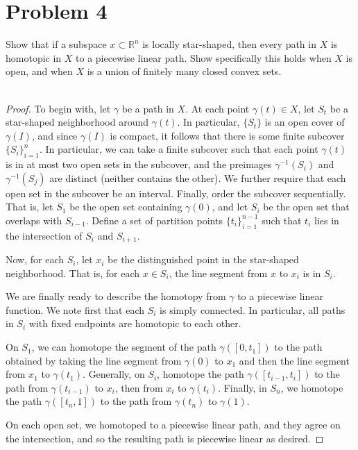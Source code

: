 \documentclass[fontsize=11pt]{scrartcl} %
\numberwithin{equation}{section} %
\numberwithin{figure}{section} %
\numberwithin{table}{section} %
\newcommand{\R}{\mathbb{R}}
\begin{document}
\section*{Problem 4}
Show that if a subspace $x\subset \R^n$ is locally star-shaped, then every path
in $X$ is homotopic in $X$ to a piecewise linear path. Show specifically this
holds when $X$ is open, and when $X$ is a union of finitely many closed convex
sets.
\\
\\
\begin{proof}
    To begin with, let $\gamma$ be a path in $X$. At each point $\gamma(t)\in
    X$, let $S_t$ be a star-shaped neighborhood around $\gamma(t)$. In
    particular, $\{S_t\}$ is an open cover of $\gamma(I)$, and since $\gamma(I)$
    is compact, it follows that there is some finite subcover $\{S_i\}_{i=1}^n$.
    In particular, we can take a finite subcover such that each point
    $\gamma(t)$ is in at most two open sets in the subcover, and the preimages
    $\gamma^{-1}(S_i)$ and $\gamma^{-1}(S_j)$ are distinct (neither contains the
    other). We further require that each open set in the subcover be an
    interval. Finally, order the subcover sequentially. That is, let $S_1$ be the
    open set containing $\gamma(0)$, and let $S_i$ be the open set that overlaps
    with $S_{i-1}$. Define a set of partition points $\{t_i\}_{i=1}^{n-1}$ such
    that $t_i$ lies in the intersection of $S_i$ and $S_{i+1}$.

    Now, for each $S_i$, let $x_i$ be the distinguished point in the star-shaped
    neighborhood. That is, for each $x\in S_i$, the line segment from $x$ to
    $x_i$ is in $S_i$.

    We are finally ready to describe the homotopy from $\gamma$ to a piecewise
    linear function. We note first that each $S_i$ is simply connected. In
    particular, all paths in $S_i$ with fixed endpoints are homotopic to each
    other.

    On $S_1$, we can homotope the segment of the path $\gamma([0,t_1])$ to the
    path obtained by taking the line segment from $\gamma(0)$ to $x_1$ and then
    the line segment from $x_1$ to $\gamma(t_1)$. Generally, on $S_i$, homotope
    the path $\gamma([t_{i-1},t_i])$ to the path from $\gamma(t_{i-1})$ to
    $x_i$, then from $x_i$ to $\gamma(t_i)$. Finally, in $S_n$, we homotope the
    path $\gamma([t_n,1])$ to the path from $\gamma(t_n)$ to $\gamma(1)$.

    On each open set, we homotoped to a piecewise linear path, and they agree on
    the intersection, and so the resulting path is piecewise linear as desired.
\end{proof}
\end{document}
